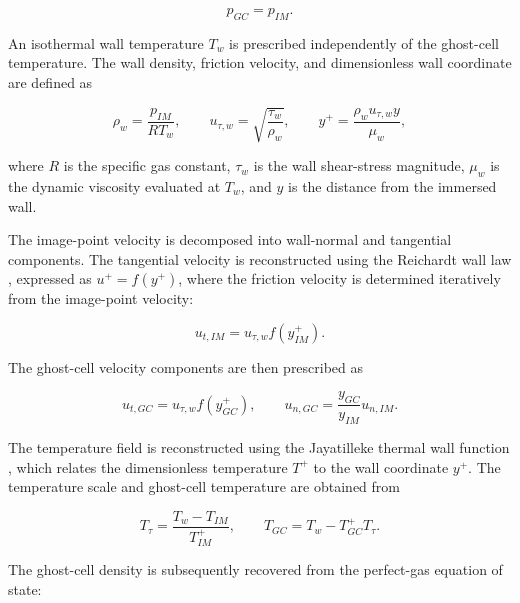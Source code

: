 \begin{equation}
    p_{GC} = p_{IM}.
    \label{ibm:eq:pressureGC}
\end{equation}

An isothermal wall temperature $T_w$ is prescribed independently of the ghost-cell temperature. The wall density, friction velocity, and dimensionless wall coordinate are defined as

\begin{equation}
    \rho_w = \frac{p_{IM}}{RT_w},
    \qquad
    u_{\tau,w} = \sqrt{\frac{\tau_w}{\rho_w}},
    \qquad
    y^+ = \frac{\rho_wu_{\tau,w}y}{\mu_w},
    \label{ibm:eq:wallScaling}
\end{equation}

where $R$ is the specific gas constant, $\tau_w$ is the wall shear-stress magnitude, $\mu_w$ is the dynamic viscosity evaluated at $T_w$, and $y$ is the distance from the immersed wall.

The image-point velocity is decomposed into wall-normal and tangential components. The tangential velocity is reconstructed using the Reichardt wall law \cite{reichardt1956}, expressed as $u^+=f(y^+)$, where the friction velocity is determined iteratively from the image-point velocity:

\begin{equation}
    u_{t,IM} = u_{\tau,w}f(y_{IM}^+).
    \label{ibm:eq:imageVelocityWF}
\end{equation}

The ghost-cell velocity components are then prescribed as

\begin{equation}
    u_{t,GC} = u_{\tau,w}f(y_{GC}^+),
    \qquad
    u_{n,GC} = \frac{y_{GC}}{y_{IM}}u_{n,IM}.
    \label{ibm:eq:velocityGC}
\end{equation}

The temperature field is reconstructed using the Jayatilleke thermal wall function \cite{jayatilleke1969}, which relates the dimensionless temperature $T^+$ to the wall coordinate $y^+$. The temperature scale and ghost-cell temperature are obtained from

\begin{equation}
    T_\tau = \frac{T_w-T_{IM}}{T_{IM}^+},
    \qquad
    T_{GC} = T_w-T_{GC}^+T_\tau.
    \label{ibm:eq:temperatureGC}
\end{equation}

The ghost-cell density is subsequently recovered from the perfect-gas equation of state:

